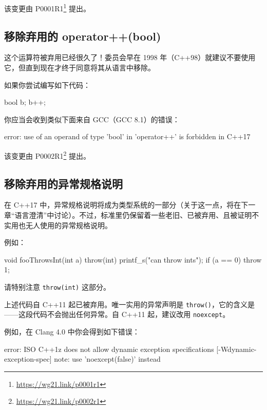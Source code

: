 \begin{myInfoBox}
该变更由 P0001R1\footnote{\url{https://wg21.link/p0001r1}} 提出。
\end{myInfoBox}

\subsection{移除弃用的 operator++(bool)}

这个运算符被弃用已经很久了！委员会早在 1998 年（C++98）就建议不要使用它，但直到现在才终于同意将其从语言中移除。

如果你尝试编写如下代码：

\begin{codebox}[cpp]
bool b;
b++;
\end{codebox}

你应当会收到类似下面来自 GCC（GCC 8.1）的错误：

\begin{codebox}[cpp]
error: use of an operand of type 'bool' in 'operator++' is forbidden in C++17
\end{codebox}

\begin{myInfoBox}
该变更由 P0002R1\footnote{\url{https://wg21.link/p0002r1}} 提出。
\end{myInfoBox}

\subsection{移除弃用的异常规格说明}

在 C++17 中，异常规格说明将成为类型系统的一部分（关于这一点，将在下一章“语言澄清”中讨论）。不过，标准里仍保留着一些老旧、已被弃用、且被证明不实用也无人使用的异常规格说明。

例如：

\begin{codebox}[cpp]
void fooThrowsInt(int a) throw(int) {
printf_s("can throw ints\n");
if (a == 0)
throw 1;
}
\end{codebox}

请特别注意 \texttt{throw(int)} 这部分。

上述代码自 C++11 起已被弃用。唯一实用的异常声明是 \texttt{throw()}，它的含义是——这段代码不会抛出任何异常。自 C++11 起，建议改用 \texttt{noexcept}。

例如，在 Clang 4.0 中你会得到如下错误：

\begin{codebox}[cpp]
error: ISO C++1z does not allow dynamic exception specifications
[-Wdynamic-exception-spec] note: use 'noexcept(false)' instead
\end{codebox}

